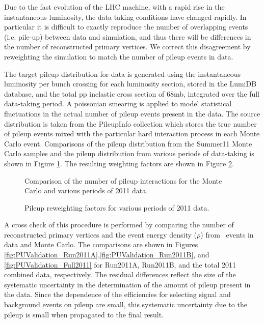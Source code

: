  Due to the fast evolution of the LHC machine, with a rapid rise in the
instantaneous luminosity, the data taking conditions have changed
rapidly.  In particular it is difficult to exactly reproduce the
number of overlapping events (i.e. pile-up) between data and
simulation, and thus there will be differences in the number of
reconstructed primary vertices. We correct this disagreement by
reweighting the simulation to match the number of pileup events in data. 

The target pileup distribution for data is generated using the instantaneous luminosity 
per bunch crossing for each luminosity section, stored in the LumiDB database, 
and the total pp inelastic cross section of $68$mb, integrated over the 
full data-taking period. A poissonian smearing is applied to model
statistical fluctuations in the actual number of pileup events 
present in the data. The source distribution is taken from the PileupInfo
collection which stores the true number of pileup events mixed with the 
particular hard interaction process in each Monte Carlo event. Comparisons of the
pileup distribution from the Summer11 Monte Carlo samples and the pileup 
distribution from various periods of data-taking is shown in Figure 
\ref{fig:NPU}. The resulting weighting factors are shown in Figure 
\ref{fig:PUReweightingFactors}. 

 
\begin{figure}[hbt]
\begin{center}
\caption{\label{fig:NPU} Comparison of the number of pileup interactions 
for the Monte Carlo and various periods of 2011 data.}
\end{center}
\end{figure}

\begin{figure}[hbt]
\begin{center}
\caption{\label{fig:PUReweightingFactors} Pileup reweighting factors for various periods of 2011 data.}
\end{center}
\end{figure}


A cross check of this procedure is performed by comparing the number of 
reconstructed primary vertices and the event energy density ($\rho$)
from \zmm\ events in data and Monte Carlo. The comparisons are shown in
Figures \ref{fig:PUValidation_Run2011A},\ref{fig:PUValidation_Run2011B},
and \ref{fig:PUValidation_Full2011} for Run2011A, Run2011B, and the 
total 2011 combined data, respectively. The residual differences 
reflect the size of the systematic uncertainty in the determination 
of the amount of pileup present in the data. Since the dependence 
of the efficiencies for selecting signal and background events on 
pileup are small, this systematic uncertainty due to the pileup 
is small when propagated to the final 
result.

